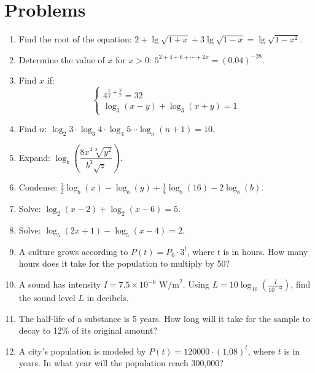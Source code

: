 \documentclass[12pt]{article}
\begin{document}
\section*{Problems}
\begin{enumerate}[leftmargin=*, itemsep=1.0em, topsep=0.8em]
  \item Find the root of the equation: $2+\lg\sqrt{1+x}+3\lg\sqrt{1-x}=\lg\sqrt{1-x^2}$.
  \item Determine the value of $x$ for $x>0$: $5^{2+4+6+\cdots+2x}=(0.04)^{-28}$.
  \item Find $x$ if:
  \[
  \begin{cases}
  4^{\frac{x}{y}+\frac{y}{x}}=32\\
  \log_3(x-y)+\log_3(x+y)=1
  \end{cases}
  \]
  \item Find $n$: $\log_{2}3\cdot\log_{3}4\cdot\log_{4}5\cdots\log_{n}(n+1)=10$.

  \item Expand: $\log_b\!\left(\dfrac{8x^4\sqrt[3]{y^2}}{b^3\sqrt{z}}\right)$.
  \item Condense: $\tfrac{3}{2}\log_b(x)-\log_b(y)+\tfrac{1}{4}\log_b(16)-2\log_b(b)$.
  \item Solve: $\log_2(x-2)+\log_2(x-6)=5$.
  \item Solve: $\log_5(2x+1)-\log_5(x-4)=2$.

  \item A culture grows according to $P(t)=P_0\cdot 3^{t}$, where $t$ is in hours. How many hours does it take for the population to multiply by 50?
  \item A sound has intensity $I=7.5\times10^{-6}\text{ W/m}^2$. Using $L=10\log_{10}\!\left(\frac{I}{10^{-12}}\right)$, find the sound level $L$ in decibels.
  \item The half-life of a substance is 5 years. How long will it take for the sample to decay to 12\% of its original amount?
  \item A city’s population is modeled by $P(t)=120000\cdot(1.08)^t$, where $t$ is in years. In what year will the population reach 300,000?
\end{enumerate}
\end{document}
